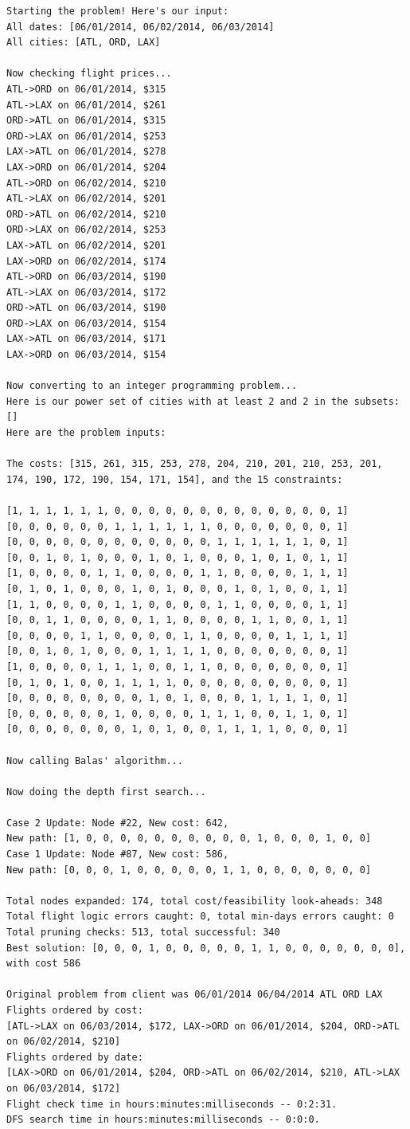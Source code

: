 \documentclass{article}
\begin{document}
\footnotesize
\begin{verbatim}
Starting the problem! Here's our input:
All dates: [06/01/2014, 06/02/2014, 06/03/2014]
All cities: [ATL, ORD, LAX]

Now checking flight prices...
ATL->ORD on 06/01/2014, $315
ATL->LAX on 06/01/2014, $261
ORD->ATL on 06/01/2014, $315
ORD->LAX on 06/01/2014, $253
LAX->ATL on 06/01/2014, $278
LAX->ORD on 06/01/2014, $204
ATL->ORD on 06/02/2014, $210
ATL->LAX on 06/02/2014, $201
ORD->ATL on 06/02/2014, $210
ORD->LAX on 06/02/2014, $253
LAX->ATL on 06/02/2014, $201
LAX->ORD on 06/02/2014, $174
ATL->ORD on 06/03/2014, $190
ATL->LAX on 06/03/2014, $172
ORD->ATL on 06/03/2014, $190
ORD->LAX on 06/03/2014, $154
LAX->ATL on 06/03/2014, $171
LAX->ORD on 06/03/2014, $154

Now converting to an integer programming problem...
Here is our power set of cities with at least 2 and 2 in the subsets: []
Here are the problem inputs:

The costs: [315, 261, 315, 253, 278, 204, 210, 201, 210, 253, 201,
174, 190, 172, 190, 154, 171, 154], and the 15 constraints:

[1, 1, 1, 1, 1, 1, 0, 0, 0, 0, 0, 0, 0, 0, 0, 0, 0, 0, 0, 1]
[0, 0, 0, 0, 0, 0, 1, 1, 1, 1, 1, 1, 0, 0, 0, 0, 0, 0, 0, 1]
[0, 0, 0, 0, 0, 0, 0, 0, 0, 0, 0, 0, 1, 1, 1, 1, 1, 1, 0, 1]
[0, 0, 1, 0, 1, 0, 0, 0, 1, 0, 1, 0, 0, 0, 1, 0, 1, 0, 1, 1]
[1, 0, 0, 0, 0, 1, 1, 0, 0, 0, 0, 1, 1, 0, 0, 0, 0, 1, 1, 1]
[0, 1, 0, 1, 0, 0, 0, 1, 0, 1, 0, 0, 0, 1, 0, 1, 0, 0, 1, 1]
[1, 1, 0, 0, 0, 0, 1, 1, 0, 0, 0, 0, 1, 1, 0, 0, 0, 0, 1, 1]
[0, 0, 1, 1, 0, 0, 0, 0, 1, 1, 0, 0, 0, 0, 1, 1, 0, 0, 1, 1]
[0, 0, 0, 0, 1, 1, 0, 0, 0, 0, 1, 1, 0, 0, 0, 0, 1, 1, 1, 1]
[0, 0, 1, 0, 1, 0, 0, 0, 1, 1, 1, 1, 0, 0, 0, 0, 0, 0, 0, 1]
[1, 0, 0, 0, 0, 1, 1, 1, 0, 0, 1, 1, 0, 0, 0, 0, 0, 0, 0, 1]
[0, 1, 0, 1, 0, 0, 1, 1, 1, 1, 0, 0, 0, 0, 0, 0, 0, 0, 0, 1]
[0, 0, 0, 0, 0, 0, 0, 0, 1, 0, 1, 0, 0, 0, 1, 1, 1, 1, 0, 1]
[0, 0, 0, 0, 0, 0, 1, 0, 0, 0, 0, 1, 1, 1, 0, 0, 1, 1, 0, 1]
[0, 0, 0, 0, 0, 0, 0, 1, 0, 1, 0, 0, 1, 1, 1, 1, 0, 0, 0, 1]

Now calling Balas' algorithm...

Now doing the depth first search...

Case 2 Update: Node #22, New cost: 642, 
New path: [1, 0, 0, 0, 0, 0, 0, 0, 0, 0, 0, 1, 0, 0, 0, 1, 0, 0]
Case 1 Update: Node #87, New cost: 586, 
New path: [0, 0, 0, 1, 0, 0, 0, 0, 0, 1, 1, 0, 0, 0, 0, 0, 0, 0]

Total nodes expanded: 174, total cost/feasibility look-aheads: 348
Total flight logic errors caught: 0, total min-days errors caught: 0
Total pruning checks: 513, total successful: 340
Best solution: [0, 0, 0, 1, 0, 0, 0, 0, 0, 1, 1, 0, 0, 0, 0, 0, 0, 0], with cost 586

Original problem from client was 06/01/2014 06/04/2014 ATL ORD LAX
Flights ordered by cost:
[ATL->LAX on 06/03/2014, $172, LAX->ORD on 06/01/2014, $204, ORD->ATL on 06/02/2014, $210]
Flights ordered by date:
[LAX->ORD on 06/01/2014, $204, ORD->ATL on 06/02/2014, $210, ATL->LAX on 06/03/2014, $172]
Flight check time in hours:minutes:milliseconds -- 0:2:31.
DFS search time in hours:minutes:milliseconds -- 0:0:0.
\end{verbatim}
\normalsize
\end{document}
